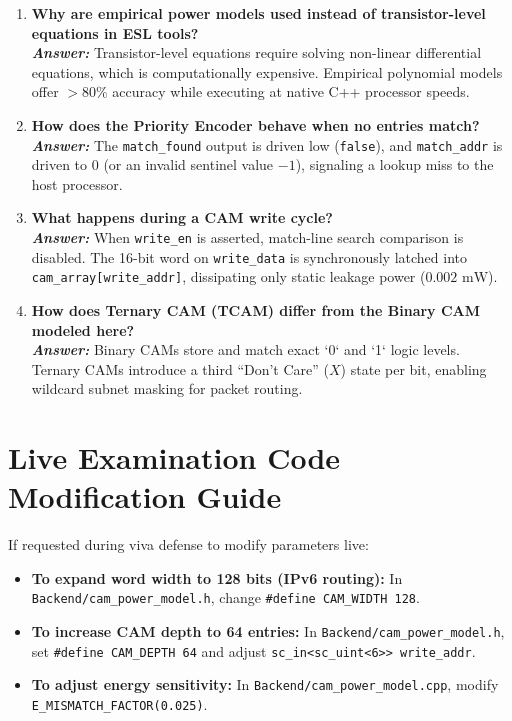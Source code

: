 \documentclass[11pt,a4paper,oneside]{report}
\begin{document}
\begin{enumerate}[leftmargin=*, label=\bfseries Q\arabic*:]
    \item \textbf{Why are empirical power models used instead of transistor-level equations in ESL tools?}\\
    \textit{\textbf{Answer:}} Transistor-level equations require solving non-linear differential equations, which is computationally expensive. Empirical polynomial models offer $>80\%$ accuracy while executing at native C++ processor speeds.

    \item \textbf{How does the Priority Encoder behave when no entries match?}\\
    \textit{\textbf{Answer:}} The \texttt{match\_found} output is driven low (\texttt{false}), and \texttt{match\_addr} is driven to $0$ (or an invalid sentinel value $-1$), signaling a lookup miss to the host processor.

    \item \textbf{What happens during a CAM write cycle?}\\
    \textit{\textbf{Answer:}} When \texttt{write\_en} is asserted, match-line search comparison is disabled. The 16-bit word on \texttt{write\_data} is synchronously latched into \texttt{cam\_array[write\_addr]}, dissipating only static leakage power ($0.002\text{ mW}$).

    \item \textbf{How does Ternary CAM (TCAM) differ from the Binary CAM modeled here?}\\
    \textit{\textbf{Answer:}} Binary CAMs store and match exact `0` and `1` logic levels. Ternary CAMs introduce a third ``Don't Care'' ($X$) state per bit, enabling wildcard subnet masking for packet routing.
\end{enumerate}

\section{Live Examination Code Modification Guide}
If requested during viva defense to modify parameters live:
\begin{itemize}[leftmargin=*]
    \item \textbf{To expand word width to 128 bits (IPv6 routing):} In \texttt{Backend/cam\_power\_model.h}, change \texttt{\#define CAM\_WIDTH 128}.
    \item \textbf{To increase CAM depth to 64 entries:} In \texttt{Backend/cam\_power\_model.h}, set \texttt{\#define CAM\_DEPTH 64} and adjust \texttt{sc\_in<sc\_uint<6>{}> write\_addr}.
    \item \textbf{To adjust energy sensitivity:} In \texttt{Backend/cam\_power\_model.cpp}, modify \texttt{E\_MISMATCH\_FACTOR(0.025)}.
\end{itemize}
\end{document}
